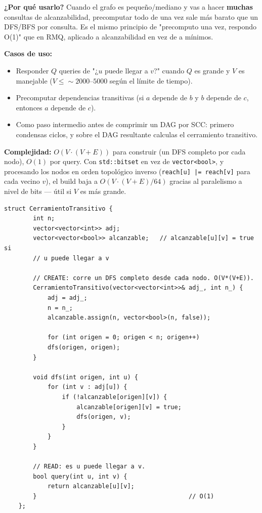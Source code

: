\documentclass[10pt,a4paper,twocolumn]{article}
\begin{document}
\textbf{¿Por qué usarlo?} Cuando el grafo es pequeño/mediano y vas a
hacer \textbf{muchas} consultas de alcanzabilidad, precomputar todo
de una vez sale más barato que un DFS/BFS por consulta. Es el mismo
principio de "precomputo una vez, respondo O(1)" que en RMQ, aplicado
a alcanzabilidad en vez de a mínimos.

\textbf{Casos de uso:}

\begin{itemize}
	\item Responder $Q$ queries de "¿$u$ puede llegar a $v$?" cuando
	$Q$ es grande y $V$ es manejable ($V \le \sim 2000$–$5000$ según
	el límite de tiempo).
	\item Precomputar dependencias transitivas (si $a$ depende de
	$b$ y $b$ depende de $c$, entonces $a$ depende de $c$).
	\item Como paso intermedio antes de comprimir un DAG por SCC:
	primero condensas ciclos, y sobre el DAG resultante calculas el
	cerramiento transitivo.
\end{itemize}

\textbf{Complejidad:} $O(V \cdot (V+E))$ para construir (un DFS
completo por cada nodo), $O(1)$ por query. Con \texttt{std::bitset}
en vez de \texttt{vector<bool>}, y procesando los nodos en orden
topológico inverso (\texttt{reach[u] |= reach[v]} para cada vecino
$v$), el build baja a $O(V \cdot (V+E) / 64)$ gracias al paralelismo
a nivel de bits — útil si $V$ es más grande.

\begin{lstlisting}[style=cpp]
	struct CerramientoTransitivo {
		int n;
		vector<vector<int>> adj;
		vector<vector<bool>> alcanzable;   // alcanzable[u][v] = true si
		// u puede llegar a v
		
		// CREATE: corre un DFS completo desde cada nodo. O(V*(V+E)).
		CerramientoTransitivo(vector<vector<int>>& adj_, int n_) {
			adj = adj_;
			n = n_;
			alcanzable.assign(n, vector<bool>(n, false));
			
			for (int origen = 0; origen < n; origen++)
			dfs(origen, origen);
		}
		
		void dfs(int origen, int u) {
			for (int v : adj[u]) {
				if (!alcanzable[origen][v]) {
					alcanzable[origen][v] = true;
					dfs(origen, v);
				}
			}
		}
		
		// READ: es u puede llegar a v.
		bool query(int u, int v) {
			return alcanzable[u][v];
		}                                          // O(1)
	};
\end{lstlisting}
\end{document}
